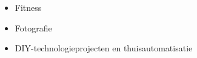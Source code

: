 \vspace{1em}
\begin{itemize}
    \item Fitness
    \item Fotografie
    \item DIY-technologieprojecten en thuisautomatisatie
\end{itemize}
